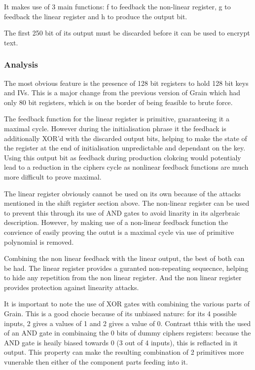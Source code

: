 \documentclass{report}
\begin{document}
It makes use of 3 main functions: f to feedback the non-linear register, g to feedback the linear register and h to produce the output bit.

The first 250 bit of its output must be discarded before it can be used to encrypt text.
\subsubsection{Analysis}
The most obvious feature is the presence of 128 bit registers to hold 128 bit keys and IVs. This is a major change from the previous version of Grain which had only 80 bit registers, which is on the border of being feasible to brute force. %

The feedback function for the linear register is primitive, guaranteeing it a maximal cycle. However during the initialisation phrase it the feedback is additionally XOR'd with the discarded output bits, helping to make the state of the register at the end of initialisation unpredictable and dependant on the key. Using this output bit as feedback during production clokcing would potentialy lead to a reduction in the ciphers cycle as nonlinear feedback functions are much more difficult to prove maximal.

The linear register obviously cannot be used on its own because of the attacks mentioned in the shift register section above. The non-linear register can be used to prevent this through its use of AND gates to avoid linarity in its algerbraic description. However, by making use of a non-linear feedback function  the convience of easily proving the outut is a maximal cycle via use of primitive polynomial is removed.

Combining the non linear feedback with the linear output, the best of both can be had. The linear register provides a guranted non-repeating sequecnce, helping to hide any repetition from the non linear register. And the non linear register provides protection against linearity attacks.

It is important to note the use of XOR gates with combining the various parts of Grain. This is a good chocie because of its unbiased nature: for its 4 possible inputs, 2 gives a values of 1 and 2 gives a value of 0. Contrast tthis with the used of an AND gate in combinaing the 0 bits of dummy ciphers registers: because the AND gate is heaily biased towards 0 (3 out of 4 inputs), this is reflacted in it output. This property can make the resulting combination of 2 primitives more vunerable then either of the component parts feeding into it.%
\end{document}
